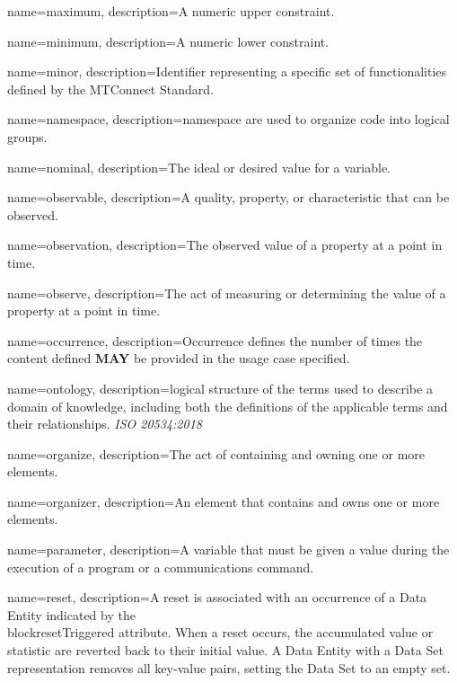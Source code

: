 {
    name={maximum},
	description={A numeric upper constraint.}
}

{
    name={minimum},
	description={A numeric lower constraint.}
}

{
    name={minor},
	description={Identifier representing a specific set of functionalities defined by the MTConnect Standard.}
}

{
    name={namespace},
	description={\gls{namespace} are used to organize code into logical groups.}
}

{
    name={nominal},
	description={The ideal or desired value for a variable.}
}

{
    name={observable},
	description={A quality, property, or characteristic that can be observed.}
}

{
    name={observation},
	description={The observed value of a property at a point in time.}
}

{
    name={observe},
	description={The act of measuring or determining the value of a property at a point in time.}
}

{
    name={occurrence},
	description={Occurrence defines the number of times the content defined \textbf{MAY} be provided in the usage case specified.}
}

{
    name={ontology},
	description={logical structure of the terms used to describe a domain of knowledge, including both the definitions of the applicable terms and their relationships. \textit{ISO 20534:2018}}
}

{
    name={organize},
	description={The act of containing and owning one or more elements.}
}

{
    name={organizer},
	description={An element that contains and owns one or more elements.}
}

{
    name={parameter},
	description={A variable that must be given a value during the execution of a program or a communications command.}
}

{
    name={reset},
	description={A reset is associated with an occurrence of a \gls{Data Entity} indicated by the \\block{resetTriggered} attribute. When a reset occurs, the accumulated value or statistic are reverted back to their initial value. A \gls{Data Entity} with a \gls{Data Set} representation removes all \glspl{key-value pair}, setting the \gls{Data Set} to an empty set.}
}

